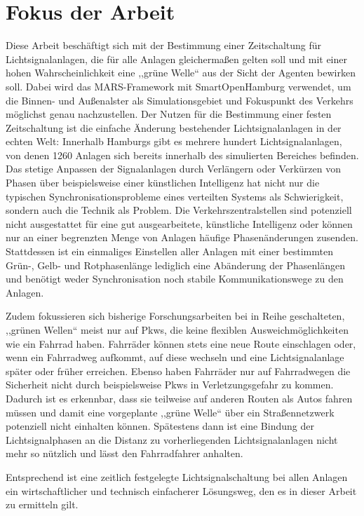 %
%


\section{Fokus der Arbeit}\label{sec:focus-of-thesis}

Diese Arbeit beschäftigt sich mit der Bestimmung einer Zeitschaltung für Lichtsignalanlagen, die für alle Anlagen gleichermaßen gelten soll und mit einer hohen Wahrscheinlichkeit eine ,,grüne Welle`` aus der Sicht der Agenten bewirken soll.
Dabei wird das MARS-Framework mit SmartOpenHamburg verwendet, um die Binnen- und Außenalster als Simulationsgebiet und Fokuspunkt des Verkehrs möglichst genau nachzustellen.
Der Nutzen für die Bestimmung einer festen Zeitschaltung ist die einfache Änderung bestehender Lichtsignalanlagen in der echten Welt: Innerhalb Hamburgs gibt es mehrere hundert Lichtsignalanlagen, von denen 1260 Anlagen sich bereits innerhalb des simulierten Bereiches befinden.
Das stetige Anpassen der Signalanlagen durch Verlängern oder Verkürzen von Phasen über beispielsweise einer künstlichen Intelligenz hat nicht nur die typischen Synchronisationsprobleme eines verteilten Systems als Schwierigkeit, sondern auch die Technik als Problem.
Die Verkehrszentralstellen sind potenziell nicht ausgestattet für eine gut ausgearbeitete, künstliche Intelligenz oder können nur an einer begrenzten Menge von Anlagen häufige Phasenänderungen zusenden.
Stattdessen ist ein einmaliges Einstellen aller Anlagen mit einer bestimmten Grün-, Gelb- und Rotphasenlänge lediglich eine Abänderung der Phasenlängen und benötigt weder Synchronisation noch stabile Kommunikationswege zu den Anlagen.

Zudem fokussieren sich bisherige Forschungsarbeiten bei in Reihe geschalteten, ,,grünen Wellen`` meist nur auf Pkws, die keine flexiblen Ausweichmöglichkeiten wie ein Fahrrad haben.
Fahrräder können stets eine neue Route einschlagen oder, wenn ein Fahrradweg aufkommt, auf diese wechseln und eine Lichtsignalanlage später oder früher erreichen.
Ebenso haben Fahrräder nur auf Fahrradwegen die Sicherheit nicht durch beispielsweise Pkws in Verletzungsgefahr zu kommen.
Dadurch ist es erkennbar, dass sie teilweise auf anderen Routen als Autos fahren müssen und damit eine vorgeplante ,,grüne Welle`` über ein Straßennetzwerk potenziell nicht einhalten können.
Spätestens dann ist eine Bindung der Lichtsignalphasen an die Distanz zu vorherliegenden Lichtsignalanlagen nicht mehr so nützlich und lässt den Fahrradfahrer anhalten.

Entsprechend ist eine zeitlich festgelegte Lichtsignalschaltung bei allen Anlagen ein wirtschaftlicher und technisch einfacherer Lösungsweg, den es in dieser Arbeit zu ermitteln gilt.
